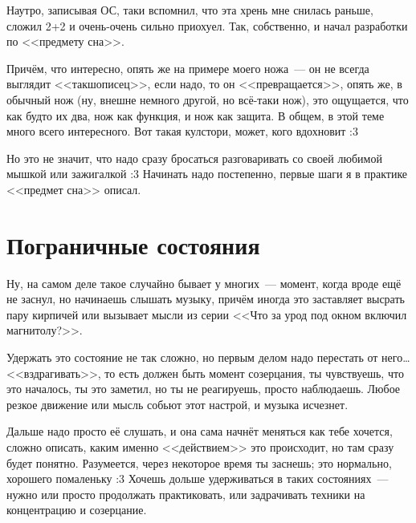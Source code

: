 \documentclass[a4paper,14pt,oneside]{memoir}
\begin{document}
Наутро, записывая ОС, таки вспомнил, что эта хрень мне снилась раньше, сложил 2+2 и очень-очень сильно приохуел. Так, собственно, и начал разработки по <<предмету сна>>.

Причём, что интересно, опять же на примере моего ножа~--- он не всегда выглядит <<такшописец>>, если надо, то он <<превращается>>, опять же, в обычный нож (ну, внешне немного другой, но всё-таки нож), это ощущается, что как будто их два, нож как функция, и нож как защита. В общем, в этой теме много всего интересного. Вот такая кулстори, может, кого вдохновит :3 

Но это не значит, что надо сразу бросаться разговаривать со своей любимой мышкой или зажигалкой :3 Начинать надо постепенно, первые шаги я в практике <<предмет сна>> описал.




\section{Пограничные состояния}

\medskip
Ну, на самом деле такое случайно бывает у многих~--- момент, когда вроде ещё не заснул, но начинаешь слышать музыку, причём иногда это заставляет высрать пару кирпичей или вызывает мысли из серии <<Что за урод под окном включил магнитолу?>>.

Удержать это состояние не так сложно, но первым делом надо перестать от него\ldots <<вздрагивать>>, то есть должен быть момент созерцания, ты чувствуешь,  что это началось, ты это заметил, но ты не реагируешь, просто наблюдаешь. Любое резкое движение или мысль собьют этот настрой, и музыка исчезнет.

Дальше надо просто её слушать, и она сама начнёт меняться как тебе хочется, сложно описать, каким именно <<действием>> это происходит, но там сразу будет понятно. Разумеется, через некоторое время ты заснешь; это нормально, хорошего помаленьку :3 Хочешь дольше удерживаться в таких состояниях~--- нужно или просто продолжать практиковать, или задрачивать техники на концентрацию и созерцание.
 
\end{document}
